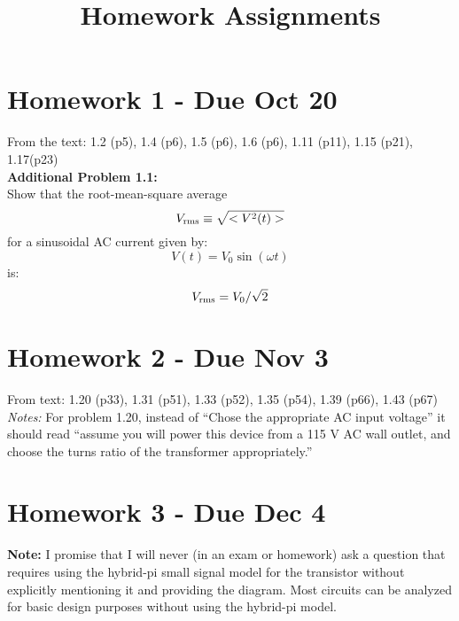 \documentclass[12pt]{article}
\begin{document}



\title{Homework Assignments}

\maketitle

\section{Homework 1 - Due Oct 20}

From the text:  1.2 (p5), 1.4 (p6), 1.5 (p6), 1.6 (p6), 1.11 (p11), 1.15 (p21), 1.17(p23)\\

\vskip 1cm
\noindent
{\bf Additional Problem 1.1:}  \\
Show that the root-mean-square average 
\begin{displaymath}
V_{\rm rms} \equiv \sqrt{<V^2(t)>}
\end{displaymath}
for a sinusoidal AC current given by:
\begin{displaymath}
V(t) = V_0 \sin(\omega t)
\end{displaymath}
is:
\begin{displaymath}
V_{\rm rms} = V_0 / \sqrt{2}
\end{displaymath}

\section{Homework 2 - Due Nov 3}

From text:  1.20 (p33), 1.31 (p51), 1.33 (p52), 1.35 (p54), 1.39 (p66), 1.43 (p67) \\

\noindent
{\em Notes:}  For problem 1.20, instead of ``Chose the appropriate AC input voltage'' it should read ``assume you will power this device from a 115 V AC wall outlet, and choose the turns ratio of the transformer appropriately.''

\newpage

\section{Homework 3 - Due Dec 4}

\noindent

{\bf Note:}  I promise that I will never (in an exam or homework) ask a question that requires using the hybrid-pi small signal model for the transistor without explicitly mentioning it and providing the diagram.  Most circuits can be analyzed for basic design purposes without using the hybrid-pi model.
\end{document}
